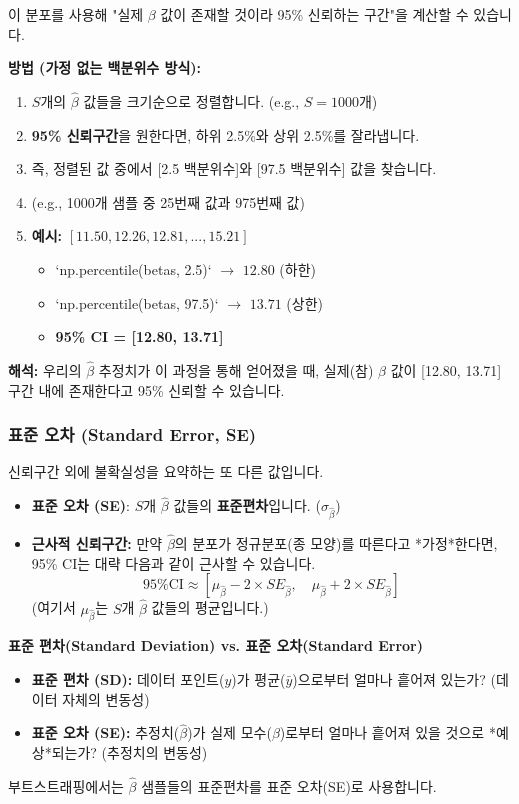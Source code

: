 \documentclass[11pt,a4paper]{book}
\theoremstyle{definition}
\begin{document}
이 분포를 사용해 "실제 $\beta$ 값이 존재할 것이라 95\% 신뢰하는 구간"을 계산할 수 있습니다.

\textbf{방법 (가정 없는 백분위수 방식):}
\begin{enumerate}
    \item $S$개의 $\hat{\beta}$ 값들을 크기순으로 정렬합니다. (e.g., $S=1000$개)
    \item \textbf{95\% 신뢰구간}을 원한다면, 하위 2.5\%와 상위 2.5\%를 잘라냅니다.
    \item 즉, 정렬된 값 중에서 [2.5 백분위수]와 [97.5 백분위수] 값을 찾습니다.
    \item (e.g., 1000개 샘플 중 25번째 값과 975번째 값)
    \item \textbf{예시:} $[11.50, 12.26, 12.81, ..., 15.21]$
        \begin{itemize}
            \item `np.percentile(betas, 2.5)` $\rightarrow$ $12.80$ (하한)
            \item `np.percentile(betas, 97.5)` $\rightarrow$ $13.71$ (상한)
            \item \textbf{95\% CI = [12.80, 13.71]}
        \end{itemize}
\end{enumerate}
\textbf{해석:} 우리의 $\hat{\beta}$ 추정치가 이 과정을 통해 얻어졌을 때, 실제(참) $\beta$ 값이 [12.80, 13.71] 구간 내에 존재한다고 95\% 신뢰할 수 있습니다.

\subsubsection{표준 오차 (Standard Error, SE)}

신뢰구간 외에 불확실성을 요약하는 또 다른 값입니다.

\begin{itemize}
    \item \textbf{표준 오차 (SE)}: $S$개 $\hat{\beta}$ 값들의 \textbf{표준편차}입니다. ($\sigma_{\hat{\beta}}$)
    \item \textbf{근사적 신뢰구간:} 만약 $\hat{\beta}$의 분포가 정규분포(종 모양)를 따른다고 *가정*한다면, 95\% CI는 대략 다음과 같이 근사할 수 있습니다.
    \[
        \text{95\% CI} \approx [\mu_{\hat{\beta}} - 2 \times SE_{\hat{\beta}}, \quad \mu_{\hat{\beta}} + 2 \times SE_{\hat{\beta}}]
    \]
    (여기서 $\mu_{\hat{\beta}}$는 $S$개 $\hat{\beta}$ 값들의 평균입니다.)
\end{itemize}

\begin{warningbox}
\textbf{표준 편차(Standard Deviation) vs. 표준 오차(Standard Error)}
\begin{itemize}
    \item \textbf{표준 편차 (SD):} 데이터 포인트($y$)가 평균($\bar{y}$)으로부터 얼마나 흩어져 있는가? (데이터 자체의 변동성)
    \item \textbf{표준 오차 (SE):} 추정치($\hat{\beta}$)가 실제 모수($\beta$)로부터 얼마나 흩어져 있을 것으로 *예상*되는가? (추정치의 변동성)
\end{itemize}
부트스트래핑에서는 $\hat{\beta}$ 샘플들의 표준편차를 표준 오차(SE)로 사용합니다.
\end{warningbox}
\end{document}
